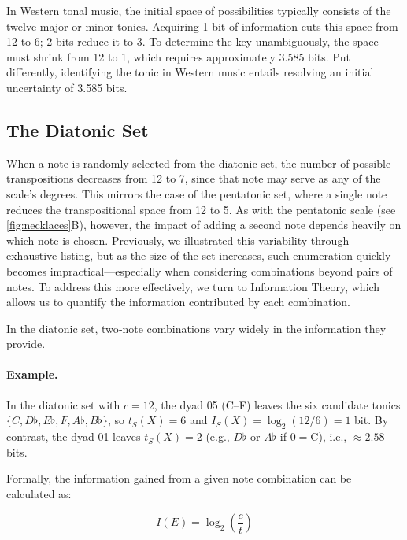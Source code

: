 \documentclass[10pt,twocolumn]{article}
\numberwithin{equation}{section} %
\begin{document}
    In Western tonal music, the initial space of possibilities typically consists of the twelve major or minor tonics.
    Acquiring 1 bit of information cuts this space from 12 to 6; 2 bits reduce it to 3.
    To determine the key unambiguously, the space must shrink from 12 to 1, which requires approximately 3.585 bits.
    Put differently, identifying the tonic in Western music entails resolving an initial uncertainty of 3.585 bits.

    \subsection{The Diatonic Set}

    When a note is randomly selected from the diatonic set, the number of possible transpositions decreases from 12 to 7, since that note may serve as any of the scale's degrees.
    This mirrors the case of the pentatonic set, where a single note reduces the transpositional space from 12 to 5.
    As with the pentatonic scale (see \autoref{fig:necklaces}B), however, the impact of adding a second note depends heavily on which note is chosen.
    Previously, we illustrated this variability through exhaustive listing, but as the size of the set increases, such enumeration quickly becomes impractical—especially when considering combinations beyond pairs of notes.
    To address this more effectively, we turn to Information Theory, which allows us to quantify the information contributed by each combination.

    In the diatonic set, two‑note combinations vary widely in the information they provide.
    \paragraph{Example.}
    In the diatonic set with $c=12$, the dyad 05 (C–F) leaves the six candidate tonics
    $\{C,D\flat,E\flat,F,A\flat,B\flat\}$, so $t_S(X)=6$ and $I_S(X)=\log_2(12/6)=1$ bit.
    By contrast, the dyad 01 leaves $t_S(X)=2$ (e.g., $D\flat$ or $A\flat$ if $0{=}$C), i.e., $\approx 2.58$ bits.



    Formally, the information gained from a given note combination can be calculated as:

    \begin{equation}
        I(E) = \log_{2} \left( \frac{c}{t} \right)
        \label{eq:derivingSelfInformation}
    \end{equation}
\end{document}
